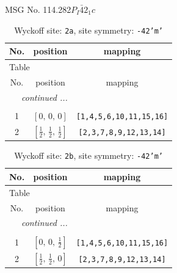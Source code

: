 \documentclass[fleqn,8pt]{jsarticle}
\begin{document}
\setcounter{MaxMatrixCols}{32}

\renewcommand{\tablename}{Table~}
\renewcommand{\figurename}{Figure~}
\begin{center}
\LARGE
MSG No. 114.282\quad$P_{I}\bar{4}2_{1}c$
\end{center}
\renewcommand{\arraystretch}{1.2}
\begin{longtable}{ccc}
\caption{Wyckoff site: {\tt 2a}, site symmetry: {\tt -42'm'}}
 \\
 \hline \hline
No. & position & mapping \\ \hline \endfirsthead

\multicolumn{2}{l}{\tablename\ \thetable{}} \\
 \hline \hline
No. & position & mapping \\ \hline \endhead

 \hline \hline
\multicolumn{2}{r}{\footnotesize\it continued ...} \\ \endfoot

 \hline \hline
\multicolumn{2}{r}{} \\ \endlastfoot

1 & $\left[ 0,\, 0,\, 0 \right]$ & {\tt [1,4,5,6,10,11,15,16]} \\ \hline
2 & $\left[ \frac{1}{2},\, \frac{1}{2},\, \frac{1}{2} \right]$ & {\tt [2,3,7,8,9,12,13,14]} \\
\end{longtable}
\renewcommand{\arraystretch}{1.2}
\begin{longtable}{ccc}
\caption{Wyckoff site: {\tt 2b}, site symmetry: {\tt -42'm'}}
 \\
 \hline \hline
No. & position & mapping \\ \hline \endfirsthead

\multicolumn{2}{l}{\tablename\ \thetable{}} \\
 \hline \hline
No. & position & mapping \\ \hline \endhead

 \hline \hline
\multicolumn{2}{r}{\footnotesize\it continued ...} \\ \endfoot

 \hline \hline
\multicolumn{2}{r}{} \\ \endlastfoot

1 & $\left[ 0,\, 0,\, \frac{1}{2} \right]$ & {\tt [1,4,5,6,10,11,15,16]} \\ \hline
2 & $\left[ \frac{1}{2},\, \frac{1}{2},\, 0 \right]$ & {\tt [2,3,7,8,9,12,13,14]} \\
\end{longtable}
\end{document}
